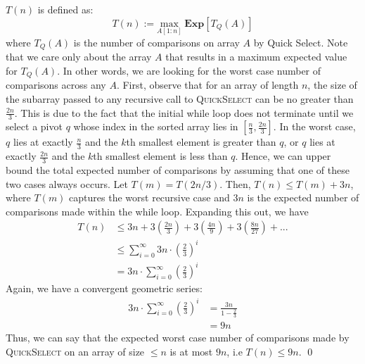 \documentclass[12pt]{article}
\begin{document}
\begin{solution}
\begin{solution}
\begin{subprob}
        \item $T(n)$ is defined as:
        \[
        T(n) := \underset{A[1:n]}{\text{max}} \hspace{3pt }\textbf{Exp}[T_Q(A)]
        \]
        where $T_Q(A)$ is the number of comparisons on array $A$ by Quick Select. Note that we care only about the array $A$ that results in a maximum expected value for $T_Q(A)$. In other words, we are looking for the worst case number of comparisons across any $A$. First, observe that for an array of length $n$, the size of the subarray passed to any recursive call to \textsc{QuickSelect} can be no greater than $\frac{2n}{3}$. This is due to the fact that the initial while loop does not terminate until we select a pivot $q$ whose index in the sorted array lies in $[\frac{n}{3}, \frac{2n}{3}]$. In the worst case, $q$ lies at exactly $\frac{n}{3}$ and the $k$th smallest element is greater than $q$, or $q$ lies at exactly $\frac{2n}{3}$ and the $k$th smallest element is less than $q$. Hence, we can upper bound the total expected number of comparisons by assuming that one of these two cases always occurs. Let $T(m) = T(2n/3)$. Then, $T(n) \leq T(m) + 3n$, where $T(m)$ captures the worst recursive case and $3n$ is the expected number of comparisons made within the while loop. Expanding this out, we have
        \begin{align*}
        T(n) &\leq 3n + 3\left(\frac{2n}{3}\right) + 3\left(\frac{4n}{9}\right) + 3\left(\frac{8n}{27}\right) + ... \\
             &\leq \sum\limits_{i=0}^{\infty} 3n \cdot \left(\frac{2}{3}\right)^i \\
             &= 3n \cdot \sum\limits_{i=0}^{\infty} \left(\frac{2}{3}\right)^i
        \end{align*}
        Again, we have a convergent geometric series:
        \begin{align*}
            3n \cdot \sum\limits_{i=0}^{\infty}\left(\frac{2}{3}\right)^i &= \frac{3n}{1-\frac{2}{3}} \\
            &= 9n
        \end{align*}
        Thus, we can say that the expected worst case number of comparisons made by \textsc{QuickSelect} on an array of size $\leq n$ is at most $9n$, i.e $T(n) \leq 9n$. \qed
         
    \end{subprob}
\end{solution}


\end{solution}
\end{document}
